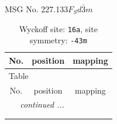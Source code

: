 \documentclass[fleqn,8pt]{jsarticle}
\begin{document}
\setcounter{MaxMatrixCols}{32}

\renewcommand{\tablename}{Table~}
\renewcommand{\figurename}{Figure~}
\begin{center}
\LARGE
MSG No. 227.133\quad$F_{S}d\bar{3}m$
\end{center}
\renewcommand{\arraystretch}{1.2}
\begin{longtable}{ccc}
\caption{Wyckoff site: {\tt 16a}, site symmetry: {\tt -43m}}
 \\
 \hline \hline
No. & position & mapping \\ \hline \endfirsthead

\multicolumn{2}{l}{\tablename\ \thetable{}} \\
 \hline \hline
No. & position & mapping \\ \hline \endhead

 \hline \hline
\multicolumn{2}{r}{\footnotesize\it continued ...} \\ \endfoot

 \hline \hline
\multicolumn{2}{r}{} \\ \endlastfoot


\end{longtable}
\end{document}

